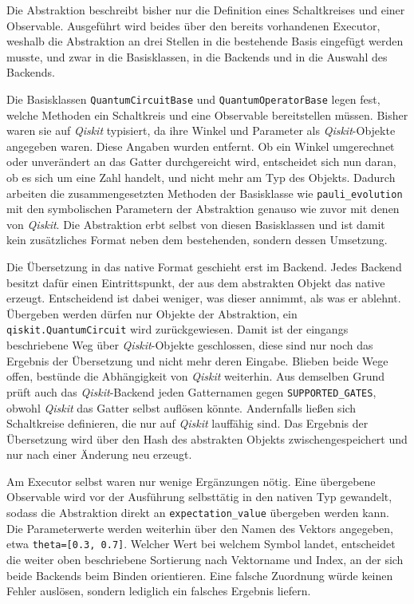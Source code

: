 Die Abstraktion beschreibt bisher nur die Definition eines Schaltkreises und einer
Observable. Ausgeführt wird beides über den bereits vorhandenen Executor, weshalb die
Abstraktion an drei Stellen in die bestehende Basis eingefügt werden musste, und zwar in die
Basisklassen, in die Backends und in die Auswahl des Backends.

Die Basisklassen \texttt{QuantumCircuitBase} und \texttt{QuantumOperatorBase} legen fest,
welche Methoden ein Schaltkreis und eine Observable bereitstellen müssen. Bisher waren sie
auf \textit{Qiskit} typisiert, da ihre Winkel und Parameter als \textit{Qiskit}-Objekte
angegeben waren. Diese Angaben wurden entfernt. Ob ein Winkel umgerechnet oder unverändert
an das Gatter durchgereicht wird, entscheidet sich nun daran, ob es sich um eine Zahl
handelt, und nicht mehr am Typ des Objekts. Dadurch arbeiten die zusammengesetzten Methoden
der Basisklasse wie \texttt{pauli\_evolution} mit den symbolischen Parametern der
Abstraktion genauso wie zuvor mit denen von \textit{Qiskit}. Die Abstraktion erbt selbst von
diesen Basisklassen und ist damit kein zusätzliches Format neben dem bestehenden, sondern
dessen Umsetzung.

Die Übersetzung in das native Format geschieht erst im Backend. Jedes Backend besitzt dafür
einen Eintrittspunkt, der aus dem abstrakten Objekt das native erzeugt. Entscheidend ist
dabei weniger, was dieser annimmt, als was er ablehnt. Übergeben werden dürfen nur Objekte
der Abstraktion, ein \texttt{qiskit.QuantumCircuit} wird zurückgewiesen. Damit ist der
eingangs beschriebene Weg über \textit{Qiskit}-Objekte geschlossen, diese sind nur noch das
Ergebnis der Übersetzung und nicht mehr deren Eingabe. Blieben beide Wege offen, bestünde die
Abhängigkeit von \textit{Qiskit} weiterhin. Aus demselben Grund prüft auch das
\textit{Qiskit}-Backend jeden Gatternamen gegen \texttt{SUPPORTED\_GATES}, obwohl
\textit{Qiskit} das Gatter selbst auflösen könnte. Andernfalls ließen sich Schaltkreise
definieren, die nur auf \textit{Qiskit} lauffähig sind. Das Ergebnis der Übersetzung wird
über den Hash des abstrakten Objekts zwischengespeichert und nur nach einer Änderung neu
erzeugt.

Am Executor selbst waren nur wenige Ergänzungen nötig. Eine übergebene Observable wird vor
der Ausführung selbsttätig in den nativen Typ gewandelt, sodass die Abstraktion direkt an
\texttt{expectation\_value} übergeben werden kann. Die Parameterwerte werden weiterhin über
den Namen des Vektors angegeben, etwa \texttt{theta=[0.3, 0.7]}. Welcher Wert bei welchem
Symbol landet, entscheidet die weiter oben beschriebene Sortierung nach
Vektorname und Index, an der sich beide Backends beim Binden orientieren. Eine falsche
Zuordnung würde keinen Fehler auslösen, sondern lediglich ein falsches Ergebnis liefern.

